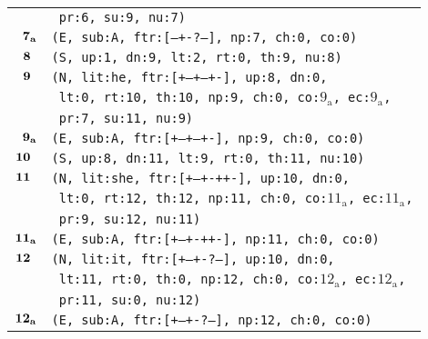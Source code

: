 \documentclass{article}
\begin{document}
\begin{minipage}{\textwidth}
{\begin{tabular}{|r|l|}
    & \texttt{\texttt{~pr:6,~su:9,~nu:7)}} \\
    ${\textbf{\textrm{7}}_{\textbf{\textrm{a}}}}$ & \texttt{\texttt{(E,~sub:A,~ftr:[---+-?--],~np:7,~ch:0,~co:0)}} \\
    ${\textbf{\textrm{8}}_{\phantom{z}}}$ & \texttt{\texttt{(S,~up:1,~dn:9,~lt:2,~rt:0,~th:9,~nu:8)}} \\
    ${\textbf{\textrm{9}}_{\phantom{z}}}$ & \texttt{\texttt{(N,~lit:he,~ftr:[+--+--+-],~up:8,~dn:0,}} \\
    & \texttt{\texttt{~lt:0,~rt:10,~th:10,~np:9,~ch:0,~co:${\textrm{9}_{\textrm{a}}}$,~ec:${\textrm{9}_{\textrm{a}}}$,}} \\
    & \texttt{\texttt{~pr:7,~su:11,~nu:9)}} \\
    ${\textbf{\textrm{9}}_{\textbf{\textrm{a}}}}$ & \texttt{\texttt{(E,~sub:A,~ftr:[+--+--+-],~np:9,~ch:0,~co:0)}} \\
    ${\textbf{\textrm{10}}_{\phantom{z}}}$ & \texttt{\texttt{(S,~up:8,~dn:11,~lt:9,~rt:0,~th:11,~nu:10)}} \\
    ${\textbf{\textrm{11}}_{\phantom{z}}}$ & \texttt{\texttt{(N,~lit:she,~ftr:[+--+-++-],~up:10,~dn:0,}} \\
    & \texttt{\texttt{~lt:0,~rt:12,~th:12,~np:11,~ch:0,~co:${\textrm{11}_{\textrm{a}}}$,~ec:${\textrm{11}_{\textrm{a}}}$,}} \\
    & \texttt{\texttt{~pr:9,~su:12,~nu:11)}} \\
    ${\textbf{\textrm{11}}_{\textbf{\textrm{a}}}}$ & \texttt{\texttt{(E,~sub:A,~ftr:[+--+-++-],~np:11,~ch:0,~co:0)}} \\
    ${\textbf{\textrm{12}}_{\phantom{z}}}$ & \texttt{\texttt{(N,~lit:it,~ftr:[+--+-?--],~up:10,~dn:0,}} \\
    & \texttt{\texttt{~lt:11,~rt:0,~th:0,~np:12,~ch:0,~co:${\textrm{12}_{\textrm{a}}}$,~ec:${\textrm{12}_{\textrm{a}}}$,}} \\
    & \texttt{\texttt{~pr:11,~su:0,~nu:12)}} \\
    ${\textbf{\textrm{12}}_{\textbf{\textrm{a}}}}$ & \texttt{\texttt{(E,~sub:A,~ftr:[+--+-?--],~np:12,~ch:0,~co:0)}} \\
    \hline
  \end{tabular}
  }
\end{minipage}
\bigbreak
\end{document}
